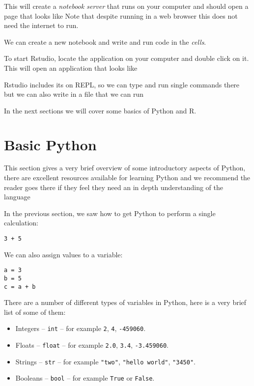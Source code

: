 This will create a \textit{notebook server} that runs on your computer and
should open a page that looks like %
Note that despite running in a web browser this does not need the internet to
run.

We can create a new notebook and write and run code in the \textit{cells}.

To start Rstudio, locate the application on your computer and double click on
it. This will open an application that looks like %

Rstudio includes its on REPL, so we can type and run single commands there but
we can also write in a file that we can run

In the next sections we will cover some basics of Python and R.

\section{Basic Python}\label{sec:basic-python}

This section gives a very brief overview of some introductory aspects of Python,
there are excellent resources available for learning Python and we recommend the
reader goes there if they feel they need an in depth understanding of the
language %

In the previous section, we saw how to get Python to perform a single
calculation:

\begin{verbatim}
3 + 5
\end{verbatim}

We can also assign values to a variable:

\begin{verbatim}
a = 3
b = 5
c = a + b
\end{verbatim}

There are a number of different types of variables in Python, here is a very
brief list of some of them:

\begin{itemize}
    \item Integers -- \texttt{int} -- for example \texttt{2},
        \texttt{4}, \texttt{-459060}.
    \item Floats -- \texttt{float} -- for example \texttt{2.0},
        \texttt{3.4}, \texttt{-3.459060}.
    \item Strings -- \texttt{str} -- for example \texttt{"two"}, \texttt{"hello
        world"}, \texttt{"3450"}.
    \item Booleans -- \texttt{bool} -- for example \texttt{True} or
        \texttt{False}.
\end{itemize}


